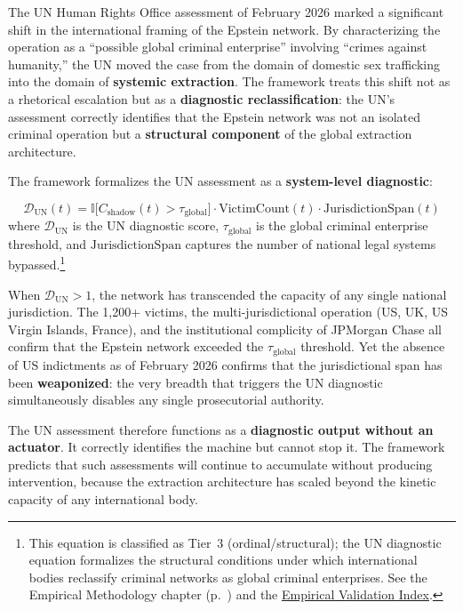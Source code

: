 The UN Human Rights Office assessment of February 2026 marked a significant shift in the international framing of the Epstein network. By characterizing the operation as a ``possible global criminal enterprise'' involving ``crimes against humanity,'' the UN moved the case from the domain of domestic sex trafficking into the domain of \textbf{systemic extraction}. The framework treats this shift not as a rhetorical escalation but as a \textbf{diagnostic reclassification}: the UN's assessment correctly identifies that the Epstein network was not an isolated criminal operation but a \textbf{structural component} of the global extraction architecture.

The framework formalizes the UN assessment as a \textbf{system-level diagnostic}:

\begin{equation}\label{eq:gp15b-un-diagnostic}
\mathcal{D}_{\text{UN}}(t) = \mathbb{I}\bigl[ C_{\text{shadow}}(t) > \tau_{\text{global}} \bigr] \cdot \text{VictimCount}(t) \cdot \text{JurisdictionSpan}(t)
\end{equation}
where $\mathcal{D}_{\text{UN}}$ is the UN diagnostic score, $\tau_{\text{global}}$ is the global criminal enterprise threshold, and $\text{JurisdictionSpan}$ captures the number of national legal systems bypassed.\footnote{This equation is classified as Tier~3 (ordinal/structural); the UN diagnostic equation formalizes the structural conditions under which international bodies reclassify criminal networks as global criminal enterprises. See the Empirical Methodology chapter (p.~\pageref{ch:empirical_methodology}) and the \hyperref[app:empirical_index]{Empirical Validation Index}.}

When $\mathcal{D}_{\text{UN}} > 1$, the network has transcended the capacity of any single national jurisdiction. The 1,200+ victims, the multi-jurisdictional operation (US, UK, US Virgin Islands, France), and the institutional complicity of JPMorgan Chase all confirm that the Epstein network exceeded the $\tau_{\text{global}}$ threshold. Yet the absence of US indictments as of February 2026 confirms that the jurisdictional span has been \textbf{weaponized}: the very breadth that triggers the UN diagnostic simultaneously disables any single prosecutorial authority.

The UN assessment therefore functions as a \textbf{diagnostic output without an actuator}. It correctly identifies the machine but cannot stop it. The framework predicts that such assessments will continue to accumulate without producing intervention, because the extraction architecture has scaled beyond the kinetic capacity of any international body.

